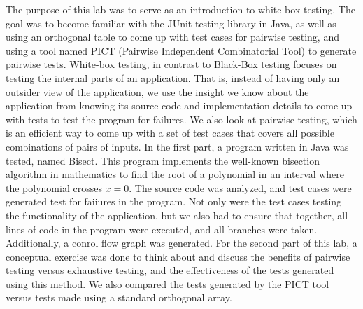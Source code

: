The purpose of this lab was to serve as an introduction to white-box testing.
The goal was to become familiar with the JUnit testing library in Java, as well
as using an orthogonal table to come up with test cases for pairwise testing,
and using a tool named PICT (Pairwise Independent Combinatorial Tool) to
generate pairwise tests. White-box testing, in contrast to Black-Box testing
focuses on testing the internal parts of an application. That is, instead of
having only an outsider view of the application, we use the insight we know
about the application from knowing its source code and implementation details
to come up with tests to test the program for failures. We also look at
pairwise testing, which is an efficient way to come up with a set of test cases
that covers all possible combinations of pairs of inputs.  In the first part, a
program written in Java was tested, named Bisect.  This program implements the
well-known bisection algorithm in mathematics to find the root of a polynomial
in an interval where the polynomial crosses $x=0$. The source code was
analyzed, and test cases were generated test for faiiures in the program. Not
only were the test cases testing the functionality of the application, but we
also had to ensure that together, all lines of code in the program were
executed, and all branches were taken. Additionally, a conrol flow graph was
generated. For the second part of this lab, a conceptual exercise was done to
think about and discuss the benefits of pairwise testing versus exhaustive
testing, and the effectiveness of the tests generated using this method. We
also compared the tests generated by the PICT tool versus tests made using a
standard orthogonal array. 

